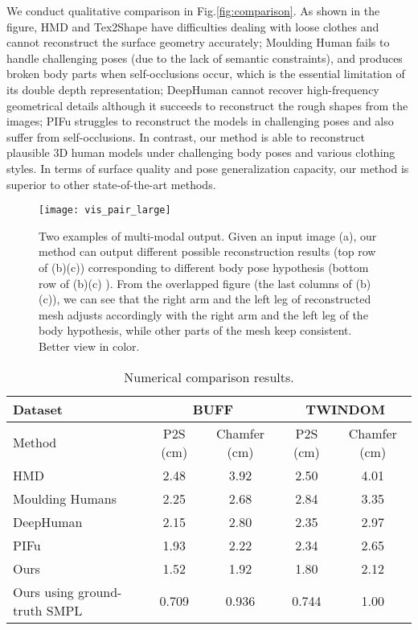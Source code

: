 We conduct qualitative comparison in Fig.\ref{fig:comparison}. As shown in the figure, HMD and Tex2Shape have difficulties dealing with loose clothes and cannot reconstruct the surface geometry accurately; Moulding Human\cite{MouldingHumans2019} fails to handle challenging poses (due to the lack of semantic constraints), and produces broken body parts when self-occlusions occur, which is the essential limitation of its double depth representation;  DeepHuman\cite{Zheng2019DeepHuman} cannot recover high-frequency geometrical details although it succeeds to reconstruct the rough shapes from the images;  PIFu\cite{pifuSHNMKL19} struggles to reconstruct the models in challenging poses and also suffer from self-occlusions. In contrast, our method is able to reconstruct plausible 3D human models under challenging body poses and various clothing styles. In terms of surface quality and pose generalization capacity, our method is superior to other state-of-the-art methods. 




\begin{figure*}
	\begin{center}
		\texttt{[image: vis\_pair\_large]}
	\end{center}
\caption{Two examples of multi-modal output. Given an input image (a), our method can output different possible reconstruction results (top row of (b)(c)) corresponding to different body pose hypothesis (bottom row of (b)(c) ). From the overlapped figure (the last columns of (b)(c)), we can see that the right arm and the left leg of reconstructed mesh adjusts accordingly with the right arm and the left leg of the body hypothesis, while other parts of the mesh keep consistent. Better view in color. }
	\label{fig:pair1}
\end{figure*}


\begin{table*}
	\caption{Numerical comparison results.  }
	\centering
	\begin{tabular}{l|c|c|c|c}
        \hline
        Dataset & \multicolumn{2}{c}{BUFF} & \multicolumn{2}{|c}{TWINDOM} \\
        \hline
		Method & P2S (cm) &  Chamfer (cm) & P2S (cm) &  Chamfer (cm)  \\
		\hline
		HMD\cite{Zheng2019DeepHuman} & 2.48 & 3.92 & 2.50 & 4.01\\
		Moulding Humans\cite{MouldingHumans2019} & 2.25 & 2.68 & 2.84 & 3.35 \\
		DeepHuman\cite{Zheng2019DeepHuman} & 2.15 & 2.80 & 2.35 & 2.97\\
		PIFu\cite{pifuSHNMKL19} & 1.93 & 2.22 & 2.34 & 2.65\\
		Ours & 1.52 & 1.92 & 1.80 & 2.12 \\
		Ours using ground-truth SMPL & 0.709 & 0.936 & 0.744 & 1.00 \\
        \hline
	\end{tabular}
	\label{tab:quant_comparison}
\end{table*}




